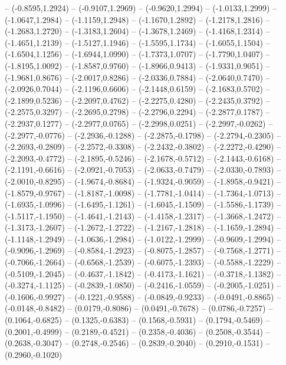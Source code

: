{	-- (-0.8595,1.2924)
	-- (-0.9107,1.2969)
	-- (-0.9620,1.2994)
	-- (-1.0133,1.2999)
	-- (-1.0647,1.2984)
	-- (-1.1159,1.2948)
	-- (-1.1670,1.2892)
	-- (-1.2178,1.2816)
	-- (-1.2683,1.2720)
	-- (-1.3183,1.2604)
	-- (-1.3678,1.2469)
	-- (-1.4168,1.2314)
	-- (-1.4651,1.2139)
	-- (-1.5127,1.1946)
	-- (-1.5595,1.1734)
	-- (-1.6055,1.1504)
	-- (-1.6504,1.1256)
	-- (-1.6944,1.0990)
	-- (-1.7373,1.0707)
	-- (-1.7790,1.0407)
	-- (-1.8195,1.0092)
	-- (-1.8587,0.9760)
	-- (-1.8966,0.9413)
	-- (-1.9331,0.9051)
	-- (-1.9681,0.8676)
	-- (-2.0017,0.8286)
	-- (-2.0336,0.7884)
	-- (-2.0640,0.7470)
	-- (-2.0926,0.7044)
	-- (-2.1196,0.6606)
	-- (-2.1448,0.6159)
	-- (-2.1683,0.5702)
	-- (-2.1899,0.5236)
	-- (-2.2097,0.4762)
	-- (-2.2275,0.4280)
	-- (-2.2435,0.3792)
	-- (-2.2575,0.3297)
	-- (-2.2695,0.2798)
	-- (-2.2796,0.2294)
	-- (-2.2877,0.1787)
	-- (-2.2937,0.1277)
	-- (-2.2977,0.0765)
	-- (-2.2998,0.0251)
	-- (-2.2997,-0.0262)
	-- (-2.2977,-0.0776)
	-- (-2.2936,-0.1288)
	-- (-2.2875,-0.1798)
	-- (-2.2794,-0.2305)
	-- (-2.2693,-0.2809)
	-- (-2.2572,-0.3308)
	-- (-2.2432,-0.3802)
	-- (-2.2272,-0.4290)
	-- (-2.2093,-0.4772)
	-- (-2.1895,-0.5246)
	-- (-2.1678,-0.5712)
	-- (-2.1443,-0.6168)
	-- (-2.1191,-0.6616)
	-- (-2.0921,-0.7053)
	-- (-2.0633,-0.7479)
	-- (-2.0330,-0.7893)
	-- (-2.0010,-0.8295)
	-- (-1.9674,-0.8684)
	-- (-1.9324,-0.9059)
	-- (-1.8958,-0.9421)
	-- (-1.8579,-0.9767)
	-- (-1.8187,-1.0098)
	-- (-1.7781,-1.0414)
	-- (-1.7364,-1.0713)
	-- (-1.6935,-1.0996)
	-- (-1.6495,-1.1261)
	-- (-1.6045,-1.1509)
	-- (-1.5586,-1.1739)
	-- (-1.5117,-1.1950)
	-- (-1.4641,-1.2143)
	-- (-1.4158,-1.2317)
	-- (-1.3668,-1.2472)
	-- (-1.3173,-1.2607)
	-- (-1.2672,-1.2722)
	-- (-1.2167,-1.2818)
	-- (-1.1659,-1.2894)
	-- (-1.1148,-1.2949)
	-- (-1.0636,-1.2984)
	-- (-1.0122,-1.2999)
	-- (-0.9609,-1.2994)
	-- (-0.9096,-1.2969)
	-- (-0.8584,-1.2923)
	-- (-0.8075,-1.2857)
	-- (-0.7568,-1.2771)
	-- (-0.7066,-1.2664)
	-- (-0.6568,-1.2539)
	-- (-0.6075,-1.2393)
	-- (-0.5588,-1.2229)
	-- (-0.5109,-1.2045)
	-- (-0.4637,-1.1842)
	-- (-0.4173,-1.1621)
	-- (-0.3718,-1.1382)
	-- (-0.3274,-1.1125)
	-- (-0.2839,-1.0850)
	-- (-0.2416,-1.0559)
	-- (-0.2005,-1.0251)
	-- (-0.1606,-0.9927)
	-- (-0.1221,-0.9588)
	-- (-0.0849,-0.9233)
	-- (-0.0491,-0.8865)
	-- (-0.0148,-0.8482)
	-- (0.0179,-0.8086)
	-- (0.0491,-0.7678)
	-- (0.0786,-0.7257)
	-- (0.1064,-0.6825)
	-- (0.1325,-0.6383)
	-- (0.1568,-0.5931)
	-- (0.1794,-0.5469)
	-- (0.2001,-0.4999)
	-- (0.2189,-0.4521)
	-- (0.2358,-0.4036)
	-- (0.2508,-0.3544)
	-- (0.2638,-0.3047)
	-- (0.2748,-0.2546)
	-- (0.2839,-0.2040)
	-- (0.2910,-0.1531)
	-- (0.2960,-0.1020)
}
